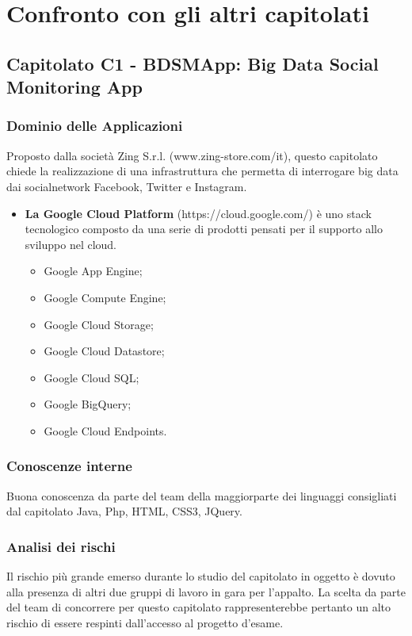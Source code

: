 \section{Confronto con gli altri capitolati}
\subsection{Capitolato C1 - BDSMApp: Big Data Social Monitoring App}
  \subsubsection{Dominio delle Applicazioni}
  Proposto dalla società Zing S.r.l. (www.zing-store.com/it), questo capitolato chiede la realizzazione di una infrastruttura che permetta di interrogare big data dai socialnetwork Facebook, Twitter e Instagram.
  \begin{itemize}
  	\item \textbf{La Google Cloud Platform} (https://cloud.google.com/) è uno stack tecnologico composto da una serie di prodotti pensati per il supporto allo sviluppo nel cloud.
  	\begin{itemize}
  		\item Google App Engine;
  		\item Google Compute Engine;
        \item Google Cloud Storage;
  		\item Google Cloud Datastore;
  		\item Google Cloud SQL;
  		\item Google BigQuery;
  		\item Google Cloud Endpoints.
  	\end{itemize}
  \end{itemize}
  \subsubsection{Conoscenze interne}
  Buona conoscenza da parte del team della maggiorparte dei linguaggi consigliati dal capitolato Java, Php, HTML, CSS3, JQuery.
  \subsubsection{Analisi dei rischi}
  Il rischio più grande emerso durante lo studio del capitolato in oggetto è dovuto alla presenza di altri due gruppi di lavoro in gara per l'appalto. La scelta da parte del team di concorrere per questo capitolato rappresenterebbe pertanto un alto rischio di essere respinti dall'accesso al progetto d'esame.
